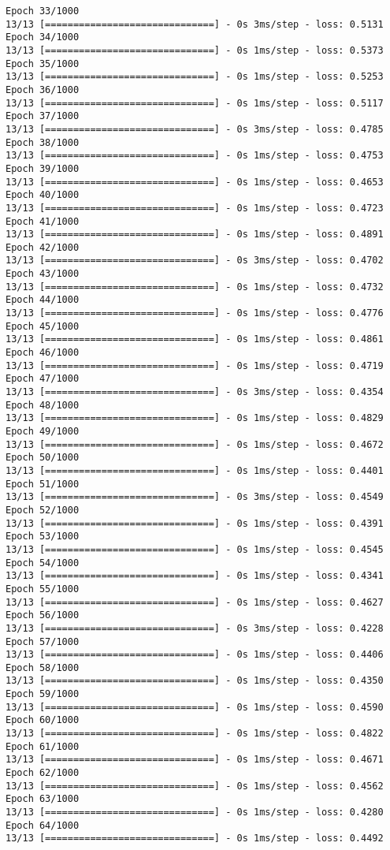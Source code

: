 \documentclass[11pt]{article}
\begin{document}
\begin{Verbatim}[commandchars=\\\{\}]
Epoch 33/1000
13/13 [==============================] - 0s 3ms/step - loss: 0.5131
Epoch 34/1000
13/13 [==============================] - 0s 1ms/step - loss: 0.5373
Epoch 35/1000
13/13 [==============================] - 0s 1ms/step - loss: 0.5253
Epoch 36/1000
13/13 [==============================] - 0s 1ms/step - loss: 0.5117
Epoch 37/1000
13/13 [==============================] - 0s 3ms/step - loss: 0.4785
Epoch 38/1000
13/13 [==============================] - 0s 1ms/step - loss: 0.4753
Epoch 39/1000
13/13 [==============================] - 0s 1ms/step - loss: 0.4653
Epoch 40/1000
13/13 [==============================] - 0s 1ms/step - loss: 0.4723
Epoch 41/1000
13/13 [==============================] - 0s 1ms/step - loss: 0.4891
Epoch 42/1000
13/13 [==============================] - 0s 3ms/step - loss: 0.4702
Epoch 43/1000
13/13 [==============================] - 0s 1ms/step - loss: 0.4732
Epoch 44/1000
13/13 [==============================] - 0s 1ms/step - loss: 0.4776
Epoch 45/1000
13/13 [==============================] - 0s 1ms/step - loss: 0.4861
Epoch 46/1000
13/13 [==============================] - 0s 1ms/step - loss: 0.4719
Epoch 47/1000
13/13 [==============================] - 0s 3ms/step - loss: 0.4354
Epoch 48/1000
13/13 [==============================] - 0s 1ms/step - loss: 0.4829
Epoch 49/1000
13/13 [==============================] - 0s 1ms/step - loss: 0.4672
Epoch 50/1000
13/13 [==============================] - 0s 1ms/step - loss: 0.4401
Epoch 51/1000
13/13 [==============================] - 0s 3ms/step - loss: 0.4549
Epoch 52/1000
13/13 [==============================] - 0s 1ms/step - loss: 0.4391
Epoch 53/1000
13/13 [==============================] - 0s 1ms/step - loss: 0.4545
Epoch 54/1000
13/13 [==============================] - 0s 1ms/step - loss: 0.4341
Epoch 55/1000
13/13 [==============================] - 0s 1ms/step - loss: 0.4627
Epoch 56/1000
13/13 [==============================] - 0s 3ms/step - loss: 0.4228
Epoch 57/1000
13/13 [==============================] - 0s 1ms/step - loss: 0.4406
Epoch 58/1000
13/13 [==============================] - 0s 1ms/step - loss: 0.4350
Epoch 59/1000
13/13 [==============================] - 0s 1ms/step - loss: 0.4590
Epoch 60/1000
13/13 [==============================] - 0s 1ms/step - loss: 0.4822
Epoch 61/1000
13/13 [==============================] - 0s 1ms/step - loss: 0.4671
Epoch 62/1000
13/13 [==============================] - 0s 1ms/step - loss: 0.4562
Epoch 63/1000
13/13 [==============================] - 0s 1ms/step - loss: 0.4280
Epoch 64/1000
13/13 [==============================] - 0s 1ms/step - loss: 0.4492

\end{Verbatim}
\end{document}
